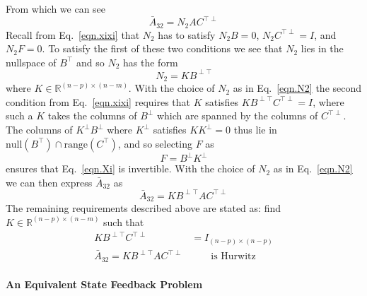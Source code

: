 \documentclass[]{../sty/JGCD}
\theoremstyle{examplestyle}
\begin{document}
  From which we can see
  \begin{equation*}
    \bar{A}_{32}=N_{2}AC^{\top\perp}
  \end{equation*}
  Recall from Eq.\ \eqref{eqn.xixi} that $N_{2}$ has to satisfy $N_{2}B=0$, $N_{2}C^{\top\perp}=I$, and $N_{2}F=0$.
  To satisfy the first of these two conditions we see that $N_{2}$ lies in the nullspace of $B^{\top}$ and so $N_{2}$ has the form
  \begin{equation}
    \label{eqn.N2}
    N_{2}=KB^{\perp\top}
  \end{equation}
  where $K\in\mathbb{R}^{(n-p)\times(n-m)}$.
  With the choice of $N_{2}$ as in Eq.\ \eqref{eqn.N2} the second condition from Eq.\ \eqref{eqn.xixi} requires that $K$ satisfies $KB^{\perp\top}C^{\top\perp} = I$, where such a $K$ takes the columns of $B^{\perp}$ which are spanned by the columns of $C^{\top\perp}$.
  The columns of $K^{\perp}B^{\perp}$ where $K^{\perp}$ satisfies $KK^{\perp}=0$ thus lie in $\text{null}(B^{\top})\cap\text{range}(C^{\top})$, and so selecting $F$ as
  \begin{equation}
    \label{eqn.FF}
    F = B^{\perp}K^{\perp}
  \end{equation}
  ensures that Eq.\ \eqref{eqn.Xi} is invertible.
  With the choice of $N_{2}$ as in Eq.\ \eqref{eqn.N2} we can then express $\bar{A}_{32}$ as
  \begin{equation*}
    \bar{A}_{32}=KB^{\perp\top}AC^{\top\perp}
  \end{equation*}
  The remaining requirements described above are stated as: find $K\in\mathbb{R}^{(n-p)\times(n-m)}$ such that
  \begin{align}
    \label{eqn.Kgeninv}
    KB^{\perp\top}C^{\top\perp}&=I_{(n-p)\times(n-p)} \\
    \label{eqn.eigK}
    \bar{A}_{32}=KB^{\perp\top}AC^{\top\perp}&\qquad\text{is Hurwitz}
  \end{align}

  \paragraph{An Equivalent State Feedback Problem}
\end{document}
